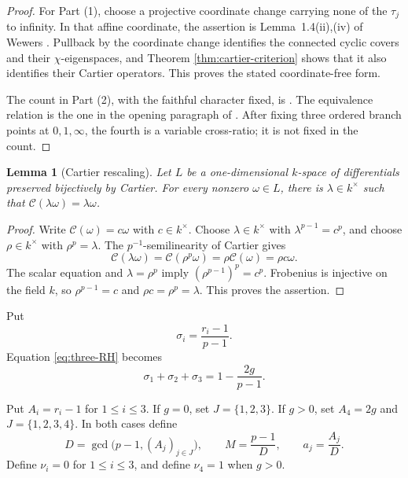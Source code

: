 \documentclass[10pt,a4paper]{amsart}
\newtheorem{lemma}[theorem]{Lemma}
\numberwithin{equation}{section}
\begin{document}
\begin{proof}
For Part (1), choose a projective coordinate change carrying none of the
$\tau_j$ to infinity.  In that affine coordinate, the assertion is
Lemma~1.4(ii),(iv) of Wewers \cite{WewersMeta}.  Pullback by the coordinate change
identifies the connected cyclic covers and their $\chi$-eigenspaces, and
Theorem \ref{thm:cartier-criterion} shows that it also identifies their
Cartier operators.  This proves the stated coordinate-free form.

The count in Part (2), with the faithful character fixed, is
\cite[Proposition~3.8]{WewersMeta}.  The equivalence relation is the one in
the opening paragraph of \cite[Section~3.5]{WewersMeta}.  After fixing
three ordered branch points at $0,1,\infty$,
the fourth is a variable cross-ratio; it is not fixed in the count.
\end{proof}

\begin{lemma}[Cartier rescaling]\label{lem:cartier-rescaling}
Let $L$ be a one-dimensional $k$-space of differentials preserved
bijectively by Cartier.  For every nonzero $\omega\in L$, there is
$\lambda\in k^\times$ such that
$\mathcal C(\lambda\omega)=\lambda\omega$.
\end{lemma}

\begin{proof}
Write $\mathcal C(\omega)=c\omega$ with $c\in k^\times$.  Choose
$\lambda\in k^\times$ with $\lambda^{p-1}=c^p$, and choose
$\rho\in k^\times$ with $\rho^p=\lambda$.  The $p^{-1}$-semilinearity of
Cartier gives
\[
 \mathcal C(\lambda\omega)
 =\mathcal C(\rho^p\omega)=\rho\mathcal C(\omega)=\rho c\omega.
\]
The scalar equation and $\lambda=\rho^p$ imply
$(\rho^{p-1})^p=c^p$.  Frobenius is injective on the field $k$, so
$\rho^{p-1}=c$ and $\rho c=\rho^p=\lambda$.  This proves the assertion.
\end{proof}

Put
\[
 \sigma_i=\frac{r_i-1}{p-1}.
\]
Equation \eqref{eq:three-RH} becomes
\[
 \sigma_1+\sigma_2+\sigma_3=1-\frac{2g}{p-1}.
 \label{eq:signature-sum}
\]

Put $A_i=r_i-1$ for $1\leq i\leq3$.  If $g=0$, set
$J=\{1,2,3\}$.  If $g>0$, set $A_4=2g$ and
$J=\{1,2,3,4\}$.  In both cases define
\begin{equation}\label{eq:central-arithmetic}
 D=\gcd\bigl(p-1,(A_j)_{j\in J}\bigr),\qquad
 M=\frac{p-1}{D},\qquad a_j=\frac{A_j}{D}.
\end{equation}
Define $\nu_i=0$ for $1\leq i\leq3$, and define $\nu_4=1$ when $g>0$.
\end{document}
